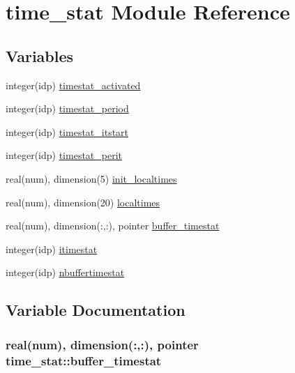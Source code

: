 \hypertarget{namespacetime__stat}{}\section{time\+\_\+stat Module Reference}
\label{namespacetime__stat}
\subsection*{Variables}
\begin{DoxyCompactItemize}
\item 
integer(idp) \hyperlink{namespacetime__stat_a1945506276b001ce513b77a643537925}{timestat\+\_\+activated}
\item 
integer(idp) \hyperlink{namespacetime__stat_ab14608304df879ee0678f16685c5d61e}{timestat\+\_\+period}
\item 
integer(idp) \hyperlink{namespacetime__stat_acb480c360afa0c963ea37a4a3b0cbb88}{timestat\+\_\+itstart}
\item 
integer(idp) \hyperlink{namespacetime__stat_ad186476b25a6b961d4149313b0fc6657}{timestat\+\_\+perit}
\item 
real(num), dimension(5) \hyperlink{namespacetime__stat_a80c25f7e592de42aba002a7756c9976a}{init\+\_\+localtimes}
\item 
real(num), dimension(20) \hyperlink{namespacetime__stat_a886a71aaf720ea3a044d9f0bcaf97eca}{localtimes}
\item 
real(num), dimension(\+:,\+:), pointer \hyperlink{namespacetime__stat_a70919afd7f3ed4f096d2ca67741fafd0}{buffer\+\_\+timestat}
\item 
integer(idp) \hyperlink{namespacetime__stat_ae56826ec9ad1786db72cebc001ac6c8b}{itimestat}
\item 
integer(idp) \hyperlink{namespacetime__stat_a59f96deeaa99d052a09d3f13fd832018}{nbuffertimestat}
\end{DoxyCompactItemize}


\subsection{Variable Documentation}
\subsubsection[{\texorpdfstring{buffer\+\_\+timestat}{buffer_timestat}}]{\setlength{\rightskip}{0pt plus 5cm}real(num), dimension(\+:,\+:), pointer time\+\_\+stat\+::buffer\+\_\+timestat}\hypertarget{namespacetime__stat_a70919afd7f3ed4f096d2ca67741fafd0}{}\label{namespacetime__stat_a70919afd7f3ed4f096d2ca67741fafd0}
